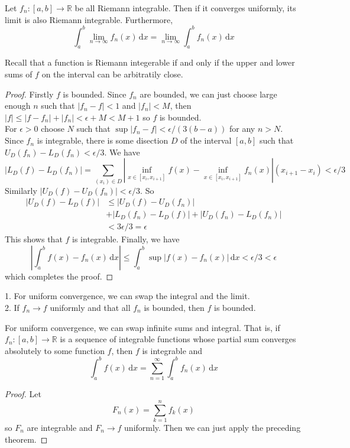 \begin{theorem}
    Let $f_n:[a,b]\to\mathbb R$ be all Riemann integrable.
    Then if it converges uniformly, its limit is also Riemann integrable.
    Furthermore,
    $$\int_a^b\lim_{n\to\infty} f_n(x)\,\mathrm dx=\lim_{n\to\infty}\int_a^b f_n(x)\,\mathrm dx$$
\end{theorem}
Recall that a function is Riemann integerable if and only if the upper and lower sums of $f$ on the interval can be arbitratily close.
\begin{proof}
    Firstly $f$ is bounded. Since $f_n$ are bounded, we can just choose large enough $n$ such that $|f_n-f|<1$ and $|f_n|<M$, then
    $|f|\le|f-f_n|+|f_n|<\epsilon+M<M+1$ so $f$ is bounded.\\
    For $\epsilon>0$ choose $N$ such that $\sup|f_n-f|<\epsilon/(3(b-a))$ for any $n>N$.
    Since $f_n$ is integrable, there is some disection $D$ of the interval $[a,b]$ such that $U_D(f_n)-L_D(f_n)<\epsilon/3$.
    We have
    $$|L_D(f)-L_D(f_n)|=\sum_{(x_i)\in D}\left|\inf_{x\in[x_i, x_{i+1}]}f(x)-\inf_{x\in[x_i, x_{i+1}]}f_n(x)\right|(x_{i+1}-x_i)<\epsilon/3$$
    Similarly $|U_D(f)-U_D(f_n)|<\epsilon/3$.
    So
    \begin{align*}
        |U_D(f)-L_D(f)|&\le|U_D(f)-U_D(f_n)|\\
        &+|L_D(f_n)-L_D(f)|+|U_D(f_n)-L_D(f_n)|\\
        &<3\epsilon/3=\epsilon
    \end{align*}
    This shows that $f$ is integrable.
    Finally, we have
    $$|\int_a^bf(x)-f_n(x)\,\mathrm dx|\le \int_a^b\sup|f(x)-f_n(x)|\,\mathrm dx<\epsilon/3<\epsilon$$
    which completes the proof.
\end{proof}
\begin{remark}
    1. For uniform convergence, we can swap the integral and the limit.\\
    2. If $f_n\to f$ uniformly and that all $f_n$ is bounded, then $f$ is bounded.
\end{remark}
\begin{corollary}
    For uniform convergence, we can swap infinite sums and integral.
    That is, if $f_n:[a,b]\to\mathbb R$ is a sequence of integrable functions whose partial sum converges absolutely to some function $f$, then $f$ is integrable and
    $$\int_a^bf(x)\,\mathrm dx=\sum_{n=1}^\infty\int_a^bf_n(x)\,\mathrm dx$$
\end{corollary}
\begin{proof}
    Let
    $$F_n(x)=\sum_{k=1}^nf_k(x)$$
    so $F_n$ are integrable and $F_n\to f$ uniformly.
    Then we can just apply the preceding theorem.
\end{proof}

